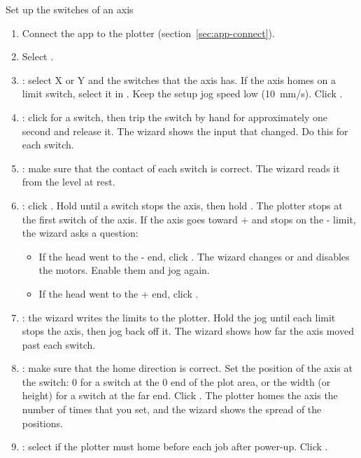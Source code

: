 \begin{procedure}{Set up the switches of an axis}
\begin{enumerate}
  \item Connect the app to the plotter (section~\ref{sec:app-connect}).
  \item Select .
  \item {}: select X or Y and the switches that the axis has. If the
        axis homes on a limit switch, select it in .
        Keep the setup jog speed low (10~mm/s). Click .
  \item {}: click  for a switch, then trip
        the switch by hand for approximately one second and release it. The
        wizard shows the input that changed. Do this for each switch.
  \item {}: make sure that the contact of each switch is correct.
        The wizard reads it from the level at rest.
  \item {}: click . Hold 
        until a switch stops the axis, then hold . The
        plotter stops at the first switch of the axis. If the axis goes
        toward + and stops on the - limit, the wizard asks a question:
        \begin{itemize}
          \item If the head went to the - end, click . The wizard changes 
                or  and disables the motors. Enable them and jog
                again.
          \item If the head went to the + end, click .
        \end{itemize}
  \item {}: the wizard writes the limits to the plotter. Hold the
        jog until each limit stops the axis, then jog back off it. The wizard
        shows how far the axis moved past each switch.
  \item {}: make sure that the home direction is correct. Set the
        position of the axis at the switch: 0 for a switch at the 0 end of the
        plot area, or the width (or height) for a switch at the far end. Click
        . The plotter homes the axis the number of times
        that you set, and the wizard shows the spread of the positions.
  \item {}: select  if the plotter must
        home before each job after power-up. Click .
\end{enumerate}
\end{procedure}

